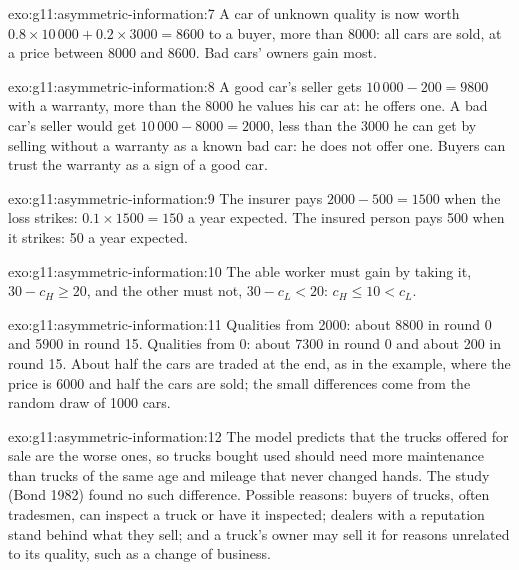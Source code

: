 \begin{solution}{exo:g11:asymmetric-information:7}
A car of unknown quality is now worth $0.8 \times 10\,000 + 0.2 \times 3000 = 8600$ to a buyer, more than 8000: all cars are sold, at a price between 8000 and 8600. Bad cars'
owners gain most.
\end{solution}

\begin{solution}{exo:g11:asymmetric-information:8}
A good car's seller gets $10\,000 - 200 = 9800$ with a warranty, more than the 8000 he values his car at: he offers one. A bad car's seller would get $10\,000 - 8000 = 2000$,
less than the 3000 he can get by selling without a warranty as a known bad car: he does not offer one. Buyers can trust the warranty as a sign of a good car.
\end{solution}

\begin{solution}{exo:g11:asymmetric-information:9}
The insurer pays $2000 - 500 = 1500$ when the loss strikes: $0.1 \times 1500 = 150$ a year expected. The insured person pays 500 when it strikes: 50 a year expected.
\end{solution}

\begin{solution}{exo:g11:asymmetric-information:10}
The able worker must gain by taking it, $30 - c_H \ge 20$, and the other must not, $30 - c_L < 20$: $c_H \le 10 < c_L$.
\end{solution}

\begin{solution}{exo:g11:asymmetric-information:11}
Qualities from 2000: about 8800 in round 0 and 5900 in round 15. Qualities from 0: about 7300 in round 0 and about 200 in round 15. About half the cars are traded at the
end, as in the example, where the price is 6000 and half the cars are sold; the small differences come from the random draw of 1000 cars.
\end{solution}

\begin{solution}{exo:g11:asymmetric-information:12}
The model predicts that the trucks offered for sale are the worse ones, so trucks bought used should need more maintenance than trucks of the same age and mileage that never
changed hands. The study (Bond 1982) found no such difference. Possible reasons: buyers of trucks, often tradesmen, can inspect a truck or have it inspected; dealers with a reputation
stand behind what they sell; and a truck's owner may sell it for reasons unrelated to its quality, such as a change of business.
\end{solution}


